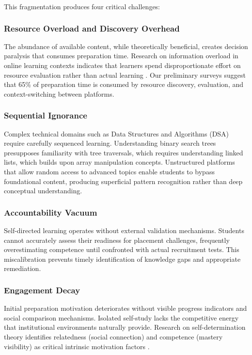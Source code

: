 \documentclass[journal]{IEEEtran}
\begin{document}
This fragmentation produces four critical challenges:

\subsubsection{Resource Overload and Discovery Overhead}
The abundance of available content, while theoretically beneficial, creates decision paralysis that consumes preparation time. Research on information overload in online learning contexts indicates that learners spend disproportionate effort on resource evaluation rather than actual learning \cite{chen2021}. Our preliminary surveys suggest that 65\% of preparation time is consumed by resource discovery, evaluation, and context-switching between platforms.

\subsubsection{Sequential Ignorance}
Complex technical domains such as Data Structures and Algorithms (DSA) require carefully sequenced learning. Understanding binary search trees presupposes familiarity with tree traversals, which requires understanding linked lists, which builds upon array manipulation concepts. Unstructured platforms that allow random access to advanced topics enable students to bypass foundational content, producing superficial pattern recognition rather than deep conceptual understanding.

\subsubsection{Accountability Vacuum}
Self-directed learning operates without external validation mechanisms. Students cannot accurately assess their readiness for placement challenges, frequently overestimating competence until confronted with actual recruitment tests. This miscalibration prevents timely identification of knowledge gaps and appropriate remediation.

\subsubsection{Engagement Decay}
Initial preparation motivation deteriorates without visible progress indicators and social comparison mechanisms. Isolated self-study lacks the competitive energy that institutional environments naturally provide. Research on self-determination theory identifies relatedness (social connection) and competence (mastery visibility) as critical intrinsic motivation factors \cite{ryan2000}.
\end{document}
